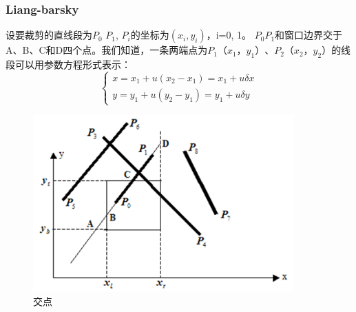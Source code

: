 \documentclass[a4paper,UTF8]{article}
\theoremstyle{definition}
\begin{document}
\subsubsection{Liang-barsky}
\par 设要裁剪的直线段为$P_{0}$ $P_{1}$, $P_{i}$的坐标为$(x_{i},y_{i})$，i=0, 1。 $P_{0} P_{1}$和窗口边界交于A、B、C和D四个点。我们知道，一条两端点为$P_{1}（x_{1}，y_{1}）、P_{2}（x_{2}，y_{2}）$的线段可以用参数方程形式表示： 
\begin{equation}
\left\{
\begin{aligned}
x=x_{1}+u(x_{2}-x_{1})=x_{1}+u\delta x\\
y=y_{1}+u(y_{2}-y_{1})=y_{1}+u\delta y
\end{aligned}
\right.
\end{equation}


\begin{figure}[ht]
\centering
\includegraphics[width=10cm]{s2.png}
\caption{交点}
\end{figure}
\end{document}
